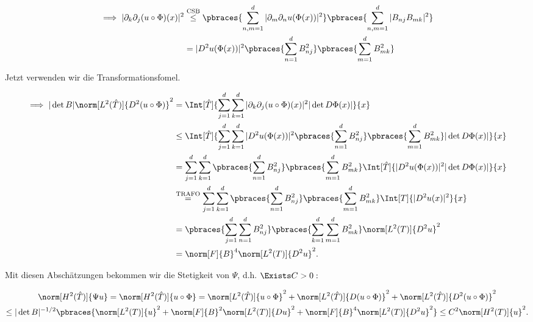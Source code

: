 \begin{solution}
\begin{enumerate}[label = \arabic*.]
  \begin{align*}
    \implies
    |\partial_k \partial_j (u \circ \Phi)(x)|^2
    &\stackrel
    {
      \mathrm{CSB}
    }
    {\leq}
    \pbraces
    {
      \sum_{n,m=1}^d
      |\partial_m \partial_n u(\Phi(x))|^2
    }
    \pbraces
    {
      \sum_{n,m=1}^d |B_{nj} B_{mk}|^2
    } \\
    &=
    |D^2 u(\Phi(x))|^2
    \pbraces
    {
      \sum_{n=1}^d
      B_{nj}^2
    }
    \pbraces
    {
      \sum_{m=1}^d
      B_{mk}^2
    }
  \end{align*}

  Jetzt verwenden wir die Transformationsfomel.

  \begin{align*}
    \implies
    |\det B| \norm[L^2(\hat T)]{D^2(u\circ\Phi)}^2
    & =
    \Int[\hat T]
    {
      \sum_{j=1}^d
      \sum_{k=1}^d
      |\partial_k \partial_j (u \circ \Phi)(x)|^2
      |\det D\Phi(x)|
    }{x} \\
    & \leq
    \Int[\hat T]
    {
      \sum_{j=1}^d
      \sum_{k=1}^d
      |D^2 u (\Phi(x))|^2
      \pbraces
      {
        \sum_{n=1}^d
        B_{nj}^2
      }
      \pbraces
      {
        \sum_{m=1}^d
        B_{mk}^2
      }
      |\det D \Phi(x)|
    }{x} \\
    & =
    \sum_{j=1}^d
    \sum_{k=1}^d
    \pbraces
    {
      \sum_{n=1}^d
      B_{nj}^2
    }
    \pbraces
    {
      \sum_{m=1}^d
      B_{mk}^2
    }
    \Int[\hat T]
    {
      |D^2 u (\Phi(x))|^2
      |\det D \Phi(x)|
    }{x} \\
    & \stackrel
    {
      \mathrm{TRAFO}
    }{=}
    \sum_{j=1}^d
    \sum_{k=1}^d
    \pbraces
    {
      \sum_{n=1}^d
      B_{nj}^2
    }
    \pbraces
    {
      \sum_{m=1}^d
      B_{mk}^2
    }
    \Int[T]{|D^2 u(x)|^2}{x} \\
    & =
    \pbraces
    {
      \sum_{j=1}^d
      \sum_{n=1}^d
      B_{nj}^2
    }
    \pbraces
    {
      \sum_{k=1}^d
      \sum_{m=1}^d
      B_{mk}^2
    }
    \norm[L^2(T)]{D^2 u}^2 \\
    & =
    \norm[F]{B}^4 \norm[L^2(T)]{D^2 u}^2.
  \end{align*}

\end{enumerate}

Mit diesen Abschätzungen bekommen wir die Stetigkeit von $\Psi$, d.h. $\Exists C > 0:$

\begin{multline*}
  \norm[H^2(\hat T)]{\Psi u}
  =
  \norm[H^2(\hat T)]{u \circ \Phi}
  =
  \norm[L^2(\hat T)]{u \circ \Phi}^2
  +
  \norm[L^2(\hat T)]{D (u \circ \Phi)}^2
  +
  \norm[L^2(\hat T)]{D^2 (u \circ \Phi)}^2 \\
  \leq
  |\det B|^{-1/2}
  \pbraces
  {
    \norm[L^2(T)]{u}^2
    +
    \norm[F]{B}^2
    \norm[L^2(T)]{Du}^2
    +
    \norm[F]{B}^4
    \norm[L^2(T)]{D^2 u}^2
  }
  \leq
  C^2 \norm[H^2(T)]{u}^2.
\end{multline*}


\end{solution}
